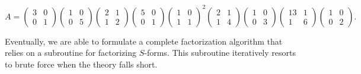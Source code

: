 \begin{example}
\[ A= \begin{pmatrix} 3 & 0 \\ 0 & 1 \end{pmatrix}\begin{pmatrix} 1 & 0 \\ 0 & 5 \end{pmatrix}\begin{pmatrix} 2 & 1 \\ 1 & 2 \end{pmatrix}\begin{pmatrix} 5 & 0 \\ 0 & 1 \end{pmatrix}\begin{pmatrix} 1 & 0 \\ 1 & 1 \end{pmatrix}^2\begin{pmatrix} 2 & 1 \\ 1 & 4 \end{pmatrix}\begin{pmatrix} 1 & 0 \\ 0 & 3 \end{pmatrix}\begin{pmatrix} 13 & 1 \\ 1 & 6 \end{pmatrix}\begin{pmatrix} 1 & 0 \\ 0 & 2 \end{pmatrix}.\]
\end{example}

Eventually, we are able to formulate a complete factorization algorithm that relies on a subroutine for factorizing $S$-forms. This subroutine iteratively resorts to brute force when the theory falls short.

